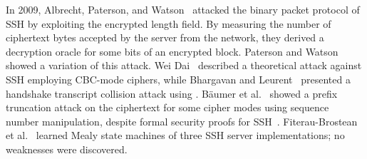 In 2009, Albrecht, Paterson, and Watson~\cite{SP:AlbPatWat09} attacked the binary packet protocol of SSH by exploiting the encrypted length field. By measuring the number of ciphertext bytes accepted by the server from the network, they derived a decryption oracle for some bits of an encrypted block. Paterson and Watson~\cite{EC:PatWat10} showed a variation of this attack. Wei Dai~\cite{weidai2002} described a theoretical attack against SSH employing CBC-mode ciphers, while Bhargavan and Leurent~\cite{NDSS:BhaLeu16} presented a handshake transcript collision attack using \shaone. Bäumer et al.~\cite{USENIX:BauBriSch24} showed a prefix truncation attack on the ciphertext for some cipher modes using sequence number manipulation, despite formal security proofs for SSH~\cite{CCS:BelKohNam02,EC:PatWat10,CCS:ADHP16}. Fiterau-Brostean et al.~\cite{fiteruau2017model} learned Mealy state machines of three SSH server implementations; no weaknesses were discovered.
